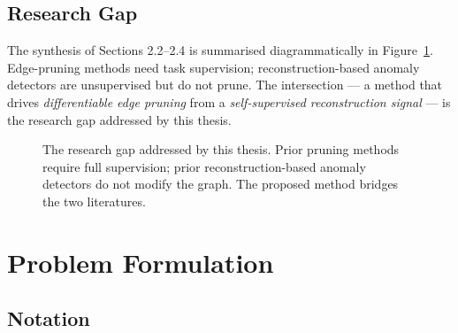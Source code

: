 \documentclass[11pt,a4paper]{report}
\theoremstyle{definition}
\theoremstyle{remark}
\begin{document}
\section{Research Gap}
\label{sec:gap}

The synthesis of Sections 2.2--2.4 is summarised diagrammatically in
Figure~\ref{fig:gap}. Edge-pruning methods need task supervision;
reconstruction-based anomaly detectors are unsupervised but do not
prune. The intersection --- a method that drives
\emph{differentiable edge pruning} from a \emph{self-supervised
reconstruction signal} --- is the research gap addressed by this thesis.

\begin{figure}[h]
\centering
{}
\caption{The research gap addressed by this thesis. Prior pruning
methods require full supervision; prior reconstruction-based anomaly
detectors do not modify the graph. The proposed method bridges the
two literatures.}
\label{fig:gap}
\end{figure}

\chapter{Problem Formulation}
\label{ch:formulation}

\section{Notation}
\end{document}
